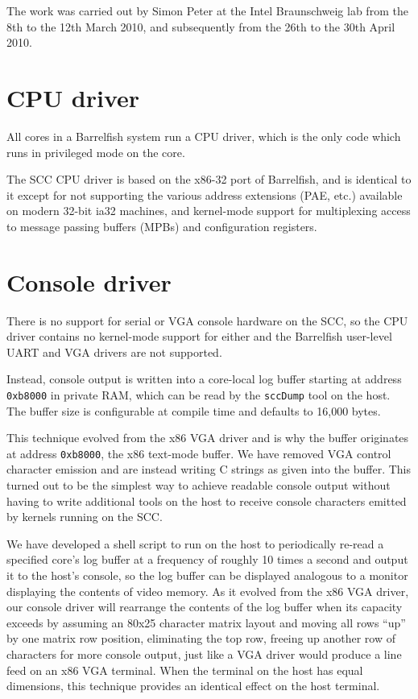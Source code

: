 \documentclass[a4paper,twoside]{report} %
\begin{document}
The work was carried out by Simon Peter at the Intel Braunschweig lab
from the 8th to the 12th March 2010, and subsequently from the 26th to
the 30th April 2010. 

\section{CPU driver}

All cores in a Barrelfish system run a CPU driver, which is the only
code which runs in privileged mode on the core.  

The SCC CPU driver is based on the x86-32 port of Barrelfish, and is
identical to it except for not supporting the various address
extensions (PAE, etc.) available on modern 32-bit ia32 machines, and
kernel-mode support for multiplexing access to message passing buffers
(MPBs) and configuration registers.

\section{Console driver}

There is no support for serial or VGA console hardware on the SCC, so
the CPU driver contains no kernel-mode support for either and the
Barrelfish user-level UART and VGA drivers are not supported.

Instead, console output is written into a core-local log buffer
starting at address \texttt{0xb8000} in private RAM, which can be read
by the \texttt{sccDump} tool on the host. The buffer size is
configurable at compile time and defaults to 16,000 bytes.

This technique evolved from the x86 VGA driver and is why the buffer
originates at address \texttt{0xb8000}, the x86 text-mode buffer. We
have removed VGA control character emission and are instead writing C
strings as given into the buffer. This turned out to be the simplest
way to achieve readable console output without having to write
additional tools on the host to receive console characters emitted by
kernels running on the SCC.

We have developed a shell script to run on the host to periodically
re-read a specified core's log buffer at a frequency of roughly 10
times a second and output it to the host's console, so the log buffer
can be displayed analogous to a monitor displaying the contents of
video memory. As it evolved from the x86 VGA driver, our console
driver will rearrange the contents of the log buffer when its capacity
exceeds by assuming an 80x25 character matrix layout and moving all
rows ``up'' by one matrix row position, eliminating the top row,
freeing up another row of characters for more console output, just
like a VGA driver would produce a line feed on an x86 VGA
terminal. When the terminal on the host has equal dimensions, this
technique provides an identical effect on the host terminal.
\end{document}
